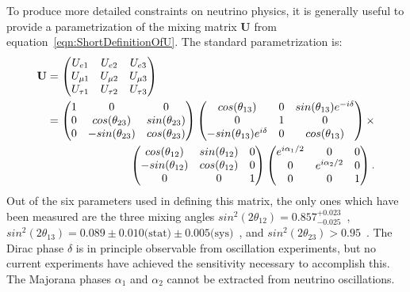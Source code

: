 To produce more detailed constraints on neutrino physics, it is generally useful to provide a parametrization of the mixing matrix $\mathbf{U}$ from equation~\ref{eqn:ShortDefinitionOfU}.  The standard parametrization is:
\begin{align} \label{eqn:LongDefinitionOfU}
  \mathbf{U} &=
    \begin{pmatrix}
    U_{e1} & U_{e2} & U_{e3} \\
    U_{\mu1} & U_{\mu2} & U_{\mu3} \\
    U_{\tau1} & U_{\tau2} & U_{\tau3}
    \end{pmatrix} \notag \\
  &= \begin{aligned}[t]
      \begin{pmatrix}
      1 & 0 & 0 \\
      0 & cos(\theta_{23}) & sin(\theta_{23}) \\
      0 & -sin(\theta_{23}) & cos(\theta_{23})
      \end{pmatrix}
      \begin{pmatrix}
      cos(\theta_{13}) & 0 & sin(\theta_{13})e^{-i\delta} \\
      0 & 1 & 0 \\
      -sin(\theta_{13})e^{i\delta} & 0 & cos(\theta_{13})
      \end{pmatrix} \times \\
      \begin{pmatrix}
      cos(\theta_{12}) & sin(\theta_{12}) & 0 \\
      -sin(\theta_{12}) & cos(\theta_{12}) & 0 \\
      0 & 0 & 1
      \end{pmatrix}
      \begin{pmatrix}
      e^{i\alpha_1/2} & 0 & 0 \\
      0 & e^{i\alpha_2/2} & 0 \\
      0 & 0 & 1
      \end{pmatrix}.
    \end{aligned}
\end{align}
Out of the six parameters used in defining this matrix, the only ones which have been measured are the three mixing angles $sin^2(2\theta_{12}) = 0.857^{+0.023}_{-0.025}$~\cite{PhysRevD.83.052002}, $sin^2(2\theta_{13}) = 0.089 \pm 0.010 \text{(stat)} \pm 0.005\text{(sys)}$~\cite{1674-1137-37-1-011001}, and $sin^2(2\theta_{23}) > 0.95$~\cite{PhysRevLett.107.241801}.  The Dirac phase $\delta$ is in principle observable from oscillation experiments, but no current experiments have achieved the sensitivity necessary to accomplish this.  The Majorana phases $\alpha_1$ and $\alpha_2$ cannot be extracted from neutrino oscillations.~\cite{RMPbb0n}

